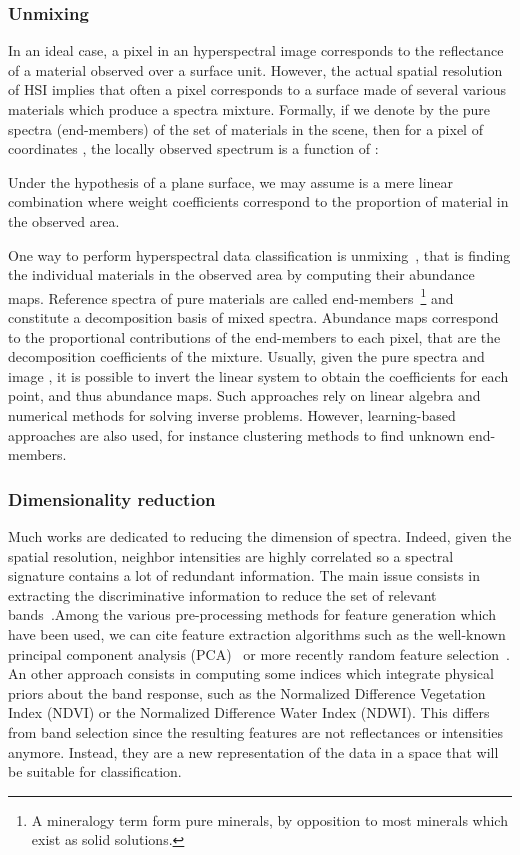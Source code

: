 \documentclass[journal]{IEEEtran}
\begin{document}
\subsubsection{Unmixing}

In an ideal case, a pixel in an hyperspectral image corresponds to the reflectance of a material observed over a surface unit. However, the actual spatial resolution of HSI implies that often a pixel corresponds to a surface made of several various materials which produce a spectra mixture. Formally, if we denote by  the pure spectra (end-members) of the set of materials in the scene, then for a pixel of coordinates , the locally observed spectrum is a function  of :

Under the hypothesis of a plane surface, we may assume  is a mere linear combination where weight coefficients  correspond to the proportion of material  in the observed area.




One way to perform hyperspectral data classification is unmixing~\cite{parra_unmixing_1999}, that is finding the individual materials in the observed area by computing their abundance maps. Reference spectra of pure materials are called end-members~\footnote{A mineralogy term form pure minerals, by opposition to most minerals which exist as solid solutions.} and constitute a decomposition basis of mixed spectra. Abundance maps correspond to the proportional contributions of the end-members to each pixel, that are the decomposition coefficients of the mixture. Usually, given the pure spectra  and image , it is possible to invert the linear system to obtain the coefficients   for each point, and thus abundance maps. Such approaches rely on linear algebra and numerical methods for solving inverse problems. However, learning-based approaches are also used, for instance clustering methods to find unknown end-members.





\subsubsection{Dimensionality reduction}

Much works are dedicated to reducing the dimension of spectra. Indeed, given the spatial resolution, neighbor intensities are highly correlated so a spectral signature contains a lot of redundant information. The main issue consists in extracting the discriminative information to reduce the set of relevant bands~\cite{le_bris_extraction_2015}.Among the various pre-processing methods for feature generation which have been used, we can cite feature extraction algorithms such as the well-known principal component analysis (PCA)~\cite{rodarmel_principal_2002} or more recently random feature selection~\cite{damodaran_sparse_2017}.
An other approach consists in computing some indices which integrate physical priors about the band response, such as the Normalized Difference Vegetation Index (NDVI) or the Normalized Difference Water Index (NDWI). This differs from band selection since the resulting features are not reflectances or intensities anymore. Instead, they are a new representation of the data in a space that will be suitable for classification.
\end{document}
